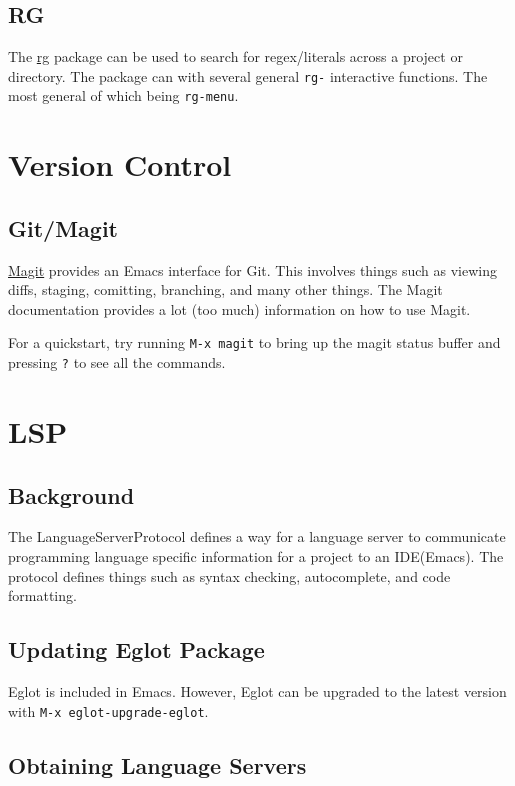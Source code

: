 \documentclass[11pt]{article}
\begin{document}
\subsection{RG}
\label{sec:org7bac3ba}

The \href{https://github.com/dajva/rg.el}{rg} package can be used to search for regex/literals across a project or
directory. The package can with several general \texttt{rg-} interactive functions. The
most general of which being \texttt{rg-menu}.
\section{Version Control}
\label{sec:org83e8984}

\subsection{Git/Magit}
\label{sec:orgbc6483f}

\href{https://github.com/magit/magit/tree/e3806cbb7dd38ab73624ad48024998705f9d0d20}{Magit} provides an Emacs interface for Git. This involves things such as viewing
diffs, staging, comitting, branching, and many other things. The Magit
documentation provides a lot (too much) information on how to use Magit.

For a quickstart, try running \texttt{M-x magit} to bring up the magit status buffer
and pressing \texttt{?} to see all the commands.
\section{LSP}
\label{sec:org44aec9d}

\subsection{Background}
\label{sec:org513aac3}
The LanguageServerProtocol defines a way for a language server to communicate
programming language specific information for a project to an IDE(Emacs). The
protocol defines things such as syntax checking, autocomplete, and code
formatting.
\subsection{Updating Eglot Package}
\label{sec:org87de168}

Eglot is included in Emacs. However, Eglot can be upgraded to the latest version
with \texttt{M-x eglot-upgrade-eglot}.
\subsection{Obtaining Language Servers}
\label{sec:org255be90}
\end{document}
